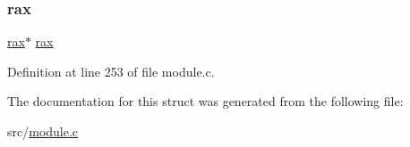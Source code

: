 \subsubsection{\texorpdfstring{rax}{rax}}
{\footnotesize\ttfamily \hyperlink{structrax}{rax}$\ast$ \hyperlink{structrax}{rax}}



Definition at line 253 of file module.\+c.



The documentation for this struct was generated from the following file\+:\begin{DoxyCompactItemize}
\item 
src/\hyperlink{module_8c}{module.\+c}\end{DoxyCompactItemize}
